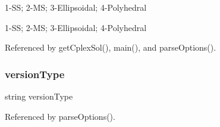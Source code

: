 1-\/\+SS; 2-\/\+MS; 3-\/\+Ellipsoidal; 4-\/\+Polyhedral 

1-\/\+SS; 2-\/\+MS; 3-\/\+Ellipsoidal; 4-\/\+Polyhedral 

Referenced by get\+Cplex\+Sol(), main(), and parse\+Options().

\mbox{\label{options_8cpp_a5623197573ddafe3e66247fc9eda58ac}} 
\subsubsection{version\+Type}
{\footnotesize\ttfamily string version\+Type}



Referenced by parse\+Options().

